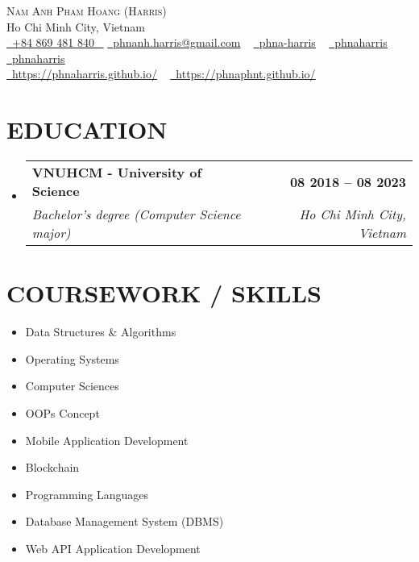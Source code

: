 \documentclass[letterpaper,11pt]{article}
\makeatletter
\newcommand{\resumeSubheading}[4]{
  \vspace{-2pt}\item
    \begin{tabular*}{1.0\textwidth}[t]{l@{\extracolsep{\fill}}r}
      \textbf{\large#1} & \textbf{\small #2} \\
      \textit{\large#3} & \textit{\small #4} \\
      
    \end{tabular*}\vspace{-7pt}
}
\newcommand{\resumeSubHeadingListStart}{\begin{itemize}[leftmargin=0.0in, label={}]}
\newcommand{\resumeSubHeadingListEnd}{\end{itemize}}
\makeatother
\begin{document}


\begin{center}
    {\Huge \scshape Nam Anh Pham Hoang (Harris)} \\ \vspace{1pt}
    Ho Chi Minh City, Vietnam \\ \vspace{1pt}
    \small \href{tel:+84 869 481 840}{ \raisebox{-0.1\height}\faPhone\ \underline{+84 869 481 840} ~}
    \href{mailto:phnanh.harris@gmail.com}{\raisebox{-0.2\height}\faEnvelope\  \underline{phnanh.harris@gmail.com}} ~ 
    \href{https://linkedin.com/in/phna-harris}{\raisebox{-0.2\height}\faLinkedinSquare\ \underline{phna-harris}}  ~
    \href{https://github.com/phnaharris}{\raisebox{-0.2\height}\faGithub\ \underline{phnaharris}} ~
    \href{https://www.hackerrank.com/phnaharris}{\raisebox{-0.2\height}\faHackerrank\ \underline{phnaharris}} \\
    \href{https://phnaharris.github.io/}{\raisebox{-0.2\height}\faGlobe\  \underline{https://phnaharris.github.io/}} ~
    \href{https://phnaphnt.github.io/}{\raisebox{-0.2\height}\faGlobe\  \underline{https://phnaphnt.github.io/}}
    \vspace{-8pt}
\end{center}


\section{EDUCATION}
  \resumeSubHeadingListStart
    \resumeSubheading
      {VNUHCM - University of Science}{08 2018 -- 08 2023}
      {Bachelor's degree (Computer Science major)}{Ho Chi Minh City, Vietnam}
  \resumeSubHeadingListEnd
  

\section{COURSEWORK / SKILLS}
        \begin{multicols}{4}
            \begin{itemize}[itemsep=-2pt, parsep=5pt]
                \item Data Structures \& Algorithms
                \item Operating Systems
                \item Computer Sciences
                \item OOPs Concept
                \item Mobile Application Development
                \item Blockchain
                \item Programming Languages
                \item Database Management System (DBMS)
                \item Web API Application Development
            \end{itemize}
        \end{multicols}
        \vspace*{2.0\multicolsep}
\end{document}
